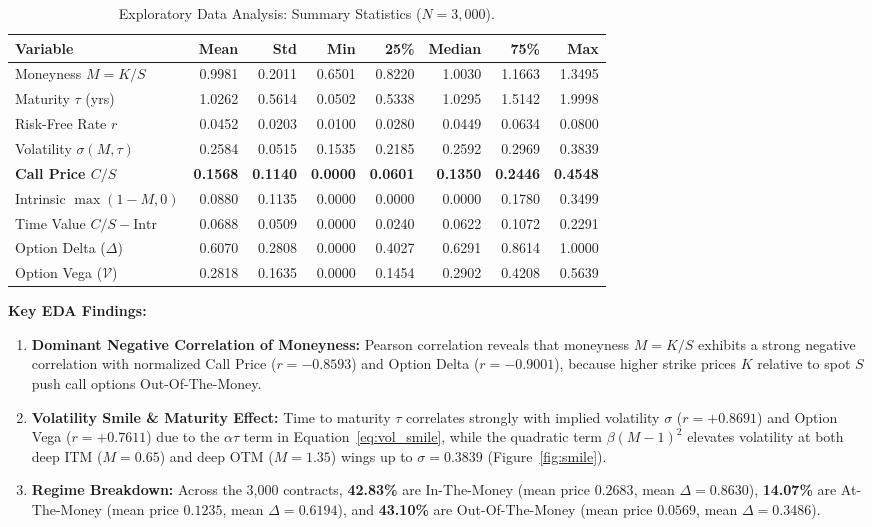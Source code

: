 \documentclass[10pt,twocolumn]{article}
\begin{document}
\begin{table}[h]
\centering
\caption{Exploratory Data Analysis: Summary Statistics ($N=3,000$).}
\label{tab:eda_stats}
\footnotesize
\setlength{\tabcolsep}{3.2pt}
\begin{tabular}{@{}lrrrrrrr@{}}
\toprule
\textbf{Variable} & \textbf{Mean} & \textbf{Std} & \textbf{Min} & \textbf{25\%} & \textbf{Median} & \textbf{75\%} & \textbf{Max} \\
\midrule
Moneyness $M = K/S$ & 0.9981 & 0.2011 & 0.6501 & 0.8220 & 1.0030 & 1.1663 & 1.3495 \\
Maturity $\tau$ (yrs) & 1.0262 & 0.5614 & 0.0502 & 0.5338 & 1.0295 & 1.5142 & 1.9998 \\
Risk-Free Rate $r$ & 0.0452 & 0.0203 & 0.0100 & 0.0280 & 0.0449 & 0.0634 & 0.0800 \\
Volatility $\sigma(M,\tau)$ & 0.2584 & 0.0515 & 0.1535 & 0.2185 & 0.2592 & 0.2969 & 0.3839 \\
\midrule
\textbf{Call Price $C/S$} & \textbf{0.1568} & \textbf{0.1140} & \textbf{0.0000} & \textbf{0.0601} & \textbf{0.1350} & \textbf{0.2446} & \textbf{0.4548} \\
Intrinsic $\max(1-M,0)$ & 0.0880 & 0.1135 & 0.0000 & 0.0000 & 0.0000 & 0.1780 & 0.3499 \\
Time Value $C/S - \text{Intr}$ & 0.0688 & 0.0509 & 0.0000 & 0.0240 & 0.0622 & 0.1072 & 0.2291 \\
Option Delta ($\Delta$) & 0.6070 & 0.2808 & 0.0000 & 0.4027 & 0.6291 & 0.8614 & 1.0000 \\
Option Vega ($\mathcal{V}$) & 0.2818 & 0.1635 & 0.0000 & 0.1454 & 0.2902 & 0.4208 & 0.5639 \\
\bottomrule
\end{tabular}
\end{table}

\textbf{Key EDA Findings:}
\begin{enumerate}
    \item \textbf{Dominant Negative Correlation of Moneyness:} Pearson correlation reveals that moneyness $M = K/S$ exhibits a strong negative correlation with normalized Call Price ($r = -0.8593$) and Option Delta ($r = -0.9001$), because higher strike prices $K$ relative to spot $S$ push call options Out-Of-The-Money.
    \item \textbf{Volatility Smile \& Maturity Effect:} Time to maturity $\tau$ correlates strongly with implied volatility $\sigma$ ($r = +0.8691$) and Option Vega ($r = +0.7611$) due to the $\alpha\tau$ term in Equation~\ref{eq:vol_smile}, while the quadratic term $\beta(M-1)^2$ elevates volatility at both deep ITM ($M=0.65$) and deep OTM ($M=1.35$) wings up to $\sigma = 0.3839$ (Figure~\ref{fig:smile}).
    \item \textbf{Regime Breakdown:} Across the 3,000 contracts, \textbf{42.83\%} are In-The-Money (mean price $0.2683$, mean $\Delta = 0.8630$), \textbf{14.07\%} are At-The-Money (mean price $0.1235$, mean $\Delta = 0.6194$), and \textbf{43.10\%} are Out-Of-The-Money (mean price $0.0569$, mean $\Delta = 0.3486$).
\end{enumerate}
\end{document}
